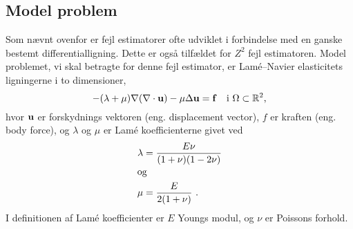 \subsection{Model problem} \label{modelafs}
Som nævnt ovenfor er fejl estimatorer ofte udviklet i forbindelse med
en ganske bestemt differentialligning. Dette er også tilfældet for
$Z^2$ fejl estimatoren. Model problemet, vi skal betragte for denne fejl
estimator, er Lam\'{e}--Navier elasticitets ligningerne i to dimensioner,
\begin{equation} \label{modpro}
  -(\lambda +\mu)\nabla (\nabla\cdot {\bf u}) -
  \mu \Delta {\bf u} = {\bf f} \quad \text{i $\Omega\subset\mathbb{R}^2$,}
\end{equation}
hvor ${\bf u}$ er forskydnings vektoren (eng. displacement vector),
$f$ er kraften (eng. body force), og $\lambda$ og $\mu$ er Lam\'{e}
koefficienterne givet ved
\begin{align}
 \lambda &= \frac{E\nu}{(1+\nu)(1-2\nu)} \\
\intertext{og}
  \mu &= \frac{E}{2(1+\nu)}\ .
\end{align}
I definitionen af Lam\'{e} koefficienter er $E$ Youngs modul, og $\nu$
er Poissons forhold.

